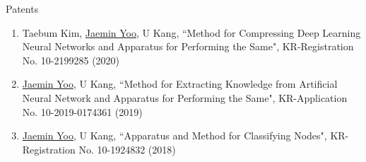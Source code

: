\documentclass{resume} %
\begin{document}

\begin{rSection}{Patents}
\smallskip
\begin{enumerate}
		
	\item Taebum Kim, \underline{Jaemin Yoo}, U Kang, ``Method for Compressing Deep Learning Neural Networks and Apparatus for Performing the Same", KR-Registration No. 10-2199285 (2020)

	\item \underline{Jaemin Yoo}, U Kang, ``Method for Extracting Knowledge from Artificial Neural Network and Apparatus for Performing the Same", KR-Application No. 10-2019-0174361 (2019)

	\item \underline{Jaemin Yoo}, U Kang, ``Apparatus and Method for Classifying Nodes", KR-Registration No. 10-1924832 (2018)

\end{enumerate}
\end{rSection}

\end{document}
